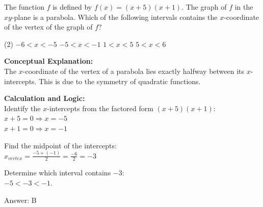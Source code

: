 \documentclass[11pt,paper=a4,answers]{exam}
\begin{document}
\begin{questions}
\pointsinrightmargin
\pointsdroppedatright
\marksnotpoints
{}
\pointformat{\boldmath\themarginpoints}
\bracketedpoints



\question
The function $f$ is defined by $f(x) = (x+5)(x+1)$. The graph of $f$ in the $xy$-plane is a parabola. Which of the following intervals contains the $x$-coordinate of the vertex of the graph of $f$?
\begin{tasks}(2)
    \task $-6 < x < -5$
    \task $-5 < x < -1$
    \task $1 < x < 5$
    \task $5 < x < 6$
\end{tasks}

\begin{solution}
\textbf{Conceptual Explanation:} \\
The $x$-coordinate of the vertex of a parabola lies exactly halfway between its $x$-intercepts. This is due to the symmetry of quadratic functions.

\vspace{20pt}

\textbf{Calculation and Logic:} \\
Identify the $x$-intercepts from the factored form $(x+5)(x+1)$: \\
$x + 5 = 0 \Rightarrow x = -5$ \\
$x + 1 = 0 \Rightarrow x = -1$

\vspace{10pt}

Find the midpoint of the intercepts: \\
$x_{vertex} = \frac{-5 + (-1)}{2} = \frac{-6}{2} = -3$

\vspace{10pt}

Determine which interval contains $-3$: \\
$-5 < -3 < -1$.

\vspace{25pt}

Answer: \colorbox{yellow!100}{B}
\end{solution}


\end{questions}
\end{document}
